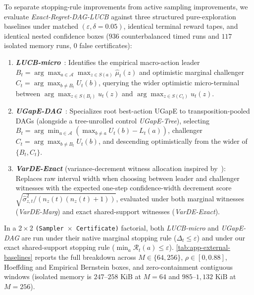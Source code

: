 \documentclass{article}
\theoremstyle{plain}
\theoremstyle{definition}
\begin{document}
To separate stopping-rule improvements from active sampling improvements, we evaluate \emph{Exact-Regret-DAG-LUCB} against three structured pure-exploration baselines under matched $(\varepsilon,\delta=0.05)$, identical terminal reward tapes, and identical nested confidence boxes ($936$ counterbalanced timed runs and $117$ isolated memory runs, $0$ false certificates):
\begin{enumerate}[leftmargin=18pt, itemsep=2pt]
\item \textbf{\emph{LUCB-micro}}~\citep{huang}: Identifies the empirical macro-action leader $B_t=\arg\max_{a\in\mathcal A}\max_{z\in S(a)}\hat\mu_t(z)$ and optimistic marginal challenger $C_t=\arg\max_{b\ne B_t}U_t(b)$, querying the wider optimistic micro-terminal between $\arg\max_{z\in S(B_t)}u_t(z)$ and $\arg\max_{z\in S(C_t)}u_t(z)$.
\item \textbf{\emph{UGapE-DAG}}~\citep{gabillon2012best,kaufmann}: Specializes root best-action UGapE to transposition-pooled DAGs (alongside a tree-unrolled control \emph{UGapE-Tree}), selecting $B_t=\arg\min_{a\in\mathcal A}(\max_{b\ne a}U_t(b)-L_t(a))$, challenger $C_t=\arg\max_{b\ne B_t}U_t(b)$, and descending optimistically from the wider of $\{B_t,C_t\}$.
\item \textbf{\emph{VarDE-Exact}} (variance-decrement witness allocation inspired by~\citealp{luong2026varde}): Replaces raw interval width when choosing between leader and challenger witnesses with the expected one-step confidence-width decrement score $\sqrt{\hat\sigma_{z,t}^2/(n_z(t)(n_z(t)+1))}$, evaluated under both marginal witnesses (\emph{VarDE-Marg}) and exact shared-support witnesses (\emph{VarDE-Exact}).
\end{enumerate}
In a $2\times 2$ \texttt{(Sampler $\times$ Certificate)} factorial, both \emph{LUCB-micro} and \emph{UGapE-DAG} are run under their native marginal stopping rule ($\Delta_t\le\varepsilon$) and under our exact shared-support stopping rule ($\min_a\mathcal R_t(a)\le\varepsilon$). \cref{tab:app-external-baselines} reports the full breakdown across $M\in\{64,256\}$, $\rho\in[0,0.88]$, Hoeffding and Empirical Bernstein boxes, and zero-containment contiguous windows (isolated memory is $247$--$258\text{ KiB}$ at $M=64$ and $985$--$1{,}132\text{ KiB}$ at $M=256$).
\end{document}
